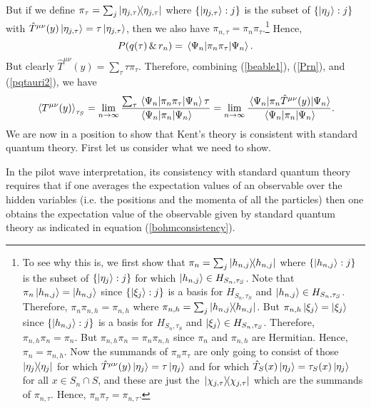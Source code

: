 But if we define $\pi_\tau=\sum_j\dyad{\eta_{j,\tau}}$ where $\{\ket{\eta_{j,\tau}}:j\}$ is the subset of  $\{\ket{\eta_j}:j\}$ with $\hat{T}^{\mu\nu}(y)\ket{\eta_{j,\tau}}=\tau\ket{\eta_{j,\tau}}$, then we also have  $\pi_{n,\tau}=\pi_n\pi_\tau$.\footnote{To see why this is, 
we first show that $\pi_n=\sum_j\dyad{h_{n,j}}$ where $\{\ket{h_{n,j}}:j\}$ is the subset of $\{\ket{\eta_j}:j\}$  for which $\ket{h_{n,j}}\in H_{S_n,\tau_S}$. 
Note that $\pi_n\ket{h_{n,j}}=\ket{h_{n,j}}$    since $\{\ket{\xi_j}:j\}$ is a basis for $H_{S_n,\tau_S}$ and $\ket{h_{n,j}}\in H_{S_n,\tau_S}$. 
Therefore, $\pi_n\pi_{n,h}=\pi_{n,h}$  where  $\pi_{n,h}=\sum_j\dyad{h_{n,j}}$. 
But  $\pi_{n,h}\ket{\xi_j}=\ket{\xi_j}$ since $\{\ket{h_{n,j}}:j\}$ is a basis for $H_{S_n,\tau_S}$ and $\ket{\xi_j}\in H_{S_n,\tau_S}$. 
Therefore, $\pi_{n,h}\pi_n=\pi_n.$ But $\pi_{n,h}\pi_n= \pi_n\pi_{n,h}$ since $\pi_n$ and $\pi_{n,h}$ are Hermitian. Hence, $\pi_n= \pi_{n,h}$. Now the summands of $\pi_n\pi_\tau$ are only going to consist of those $\dyad{\eta_j}$ for which $\hat{T}^{\mu\nu}(y)\ket{\eta_j}=\tau\ket{\eta_j}$ and for which $\hat{T}_S(x)\ket{\eta_j}=\tau_S(x)\ket{\eta_j}$ for all $x\in S_n\cap S$, and these are just the $\dyad*{\chi_{j,\tau}}$ which are the summands of  $\pi_{n,\tau}$. Hence,  $\pi_n\pi_\tau=\pi_{n,\tau}.$} 
  Hence,
\begin{equation}\label{pqtauri2}
P(q(\tau)\, \& \, r_n)=\ev*{\pi_n\pi_\tau}{\Psi_n}.
\end{equation}
But clearly $\hat{T}^{\mu\nu}(y)=\sum_\tau \tau \pi_\tau.$ Therefore, combining (\ref{beable1}), (\ref{Prn}), and (\ref{pqtauri2}), we have 
\begin{equation}\label{kentconsistency0}
\ev*{T^{\mu\nu}(y)}_{\tau_S}=\lim_{n\rightarrow\infty}\frac{\sum_\tau \ev*{\pi_n\pi_\tau}{\Psi_n}\tau}{\ev*{\pi_n}{\Psi_n}}=\lim_{n\rightarrow\infty}\frac{\ev*{\pi_n\hat{T}^{\mu\nu}(y)}{\Psi_n}}{\ev*{\pi_n}{\Psi_n}}.
\end{equation}
We are now in a position to show that Kent's theory is consistent with standard quantum theory. First let us consider what we need to show. 

In the pilot wave interpretation, its consistency with standard quantum theory requires that if one averages the expectation values of an observable over the hidden variables (i.e. the positions and the momenta of all the particles) then one obtains the expectation value of the observable given by standard quantum theory as indicated in equation (\ref{bohmconsistency}). 

